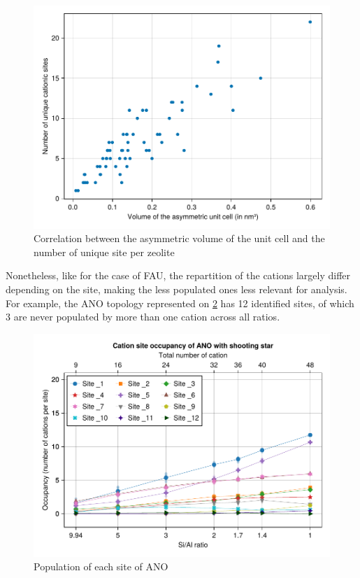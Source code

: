 \documentclass[main.tex]{subfiles}
\begin{document}
\begin{figure}
	\centering
	\includegraphics[width=0.8\linewidth]{figures/cations/sitesasymmetricvolumecell.pdf}
	\caption{Correlation between the asymmetric volume of the unit cell and the number of unique site per zeolite}\label{fig:sitesvolumecell}
\end{figure}

Nonetheless, like for the case of FAU, the repartition of the cations largely differ depending on the site, making the less populated ones less relevant for analysis. For example, the ANO topology represented on \cref{fig:ANO} has 12 identified sites, of which 3 are never populated by more than one cation across all \SiAl ratios.

\begin{figure}
	\centering
	\includegraphics[width=\linewidth]{figures/cations/ANO.pdf}
	\caption{Population of each site of ANO}\label{fig:ANO}
\end{figure}
\end{document}
